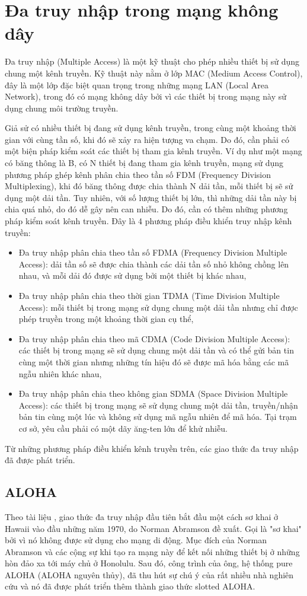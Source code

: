 \section{Đa truy nhập trong mạng không dây}
Đa truy nhập (Multiple Access) là một kỹ thuật cho phép nhiều thiết bị sử dụng chung một kênh truyền. Kỹ thuật này nằm ở lớp MAC (Medium Access Control), đây là một lớp đặc biệt quan trọng trong những mạng LAN (Local Area Network), trong đó có mạng không dây bởi vì các thiết bị trong mạng này sử dụng chung môi trường truyền.
\par
Giả sử có nhiều thiết bị đang sử dụng kênh truyền, trong cùng một khoảng thời gian với cùng tần số, khi đó sẽ xảy ra hiện tượng va chạm. Do đó, cần phải có một biện pháp kiểm soát các thiết bị tham gia kênh truyền. Ví dụ như một mạng có băng thông là B, có N thiết bị đang tham gia kênh truyền, mạng sử dụng phương pháp ghép kênh phân chia theo tần số FDM (Frequency Division Multiplexing), khi đó băng thông được chia thành N dải tần, mỗi thiết bị sẽ sử dụng một dải tần. Tuy nhiên, với số lượng thiết bị lớn, thì những dải tần này bị chia quá nhỏ, do đó dễ gây nên can nhiễu. Do đó, cần có thêm những phương pháp kiểm soát kênh truyền. Đây là 4 phương pháp điều khiển truy nhập kênh truyền:
\begin{itemize}
\item Đa truy nhập phân chia theo tần số FDMA (Frequency Division Multiple Access): dải tần số sẽ được chia thành các dải tần số nhỏ không chồng lên nhau, và mỗi dải đó được sử dụng bởi một thiết bị khác nhau, 
\item Đa truy nhập phân chia theo thời gian TDMA (Time Division Multiple Access): mỗi thiết bị trong mạng sử dụng chung một dải tần nhưng chỉ được phép truyền trong một khoảng thời gian cụ thể,
\item Đa truy nhập phân chia theo mã CDMA (Code Division Multiple Access): các thiết bị trong mạng sẽ sử dụng chung một dải tần và có thể gửi bản tin cùng một thời gian nhưng những tín hiệu đó sẽ được mã hóa bằng các mã ngẫu nhiên khác nhau,
\item Đa truy nhập phân chia theo không gian SDMA (Space Division Multiple Access): các thiết bị trong mạng sẽ sử dụng chung một dải tần, truyền/nhận bản tin cùng một lúc và không sử dụng mã ngẫu nhiên để mã hóa. Tại trạm cơ sở, yêu cầu phải có một dãy ăng-ten lớn để khử nhiễu. 
\end{itemize}
Từ những phương pháp điều khiển kênh truyền trên, các giao thức đa truy nhập đã được phát triển.
\subsection{ALOHA}
Theo tài liệu \cite{6}, giao thức đa truy nhập đầu tiên bắt đầu một cách sơ khai ở Hawaii vào đầu những năm 1970, do Norman Abramson đề xuất. Gọi là "sơ khai" bởi vì nó không được sử dụng cho mạng di động. Mục đích của Norman Abramson và các cộng sự khi tạo ra mạng này để kết nối những thiết bị ở những hòn đảo xa tới máy chủ ở Honolulu. Sau đó, công trình của ông, hệ thống pure ALOHA (ALOHA nguyên thủy), đã thu hút sự chú ý của rất nhiều nhà nghiên cứu và nó đã được phát triển thêm thành giao thức slotted ALOHA.
